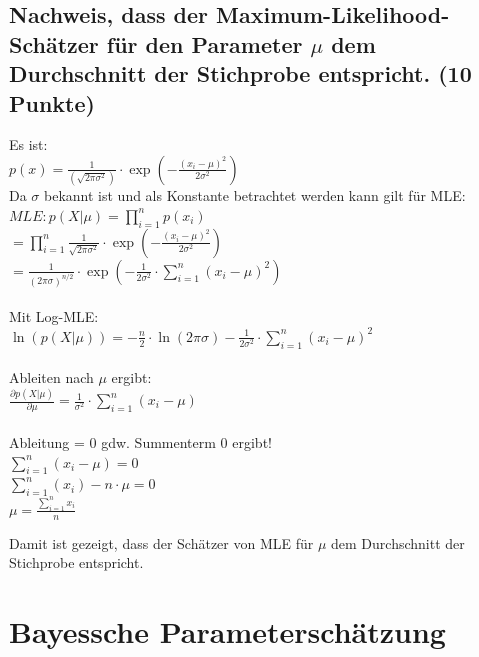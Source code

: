 \documentclass{scrartcl}
\begin{document}
\subsection*{Nachweis, dass der Maximum-Likelihood-Schätzer für den Parameter $\mu$ dem Durchschnitt der Stichprobe entspricht. (10 Punkte)}
Es ist:\\
$p(x)=\frac{1}{(\sqrt{2\pi \sigma^2})} \cdot \exp(-\frac{(x_i-\mu)^2}{2\sigma^2})$\\
Da $\sigma$ bekannt ist und als Konstante betrachtet werden kann gilt für MLE:\\
$MLE: p(X|\mu)=\prod_{i=1}^{n}p(x_i) $\\
$=\prod_{i=1}^{n}\frac{1}{\sqrt{2\pi \sigma^2}} \cdot \exp(-\frac{(x_i-\mu)^2}{2\sigma^2}) $\\
$= \frac{1}{(2\pi \sigma)^{n/2}} \cdot \exp(-\frac{1}{2\sigma^2} \cdot \sum_{i=1}^{n}(x_i-\mu)^2)$\\\\
Mit Log-MLE:\\
$\ln(p(X|\mu))= -\frac{n}{2} \cdot \ln(2\pi \sigma) - \frac{1}{2\sigma^2} \cdot \sum_{i=1}^{n}(x_i-\mu)^2$\\\\
Ableiten nach $\mu$ ergibt:\\
$\frac{\partial p(X|\mu)}{\partial \mu} = \frac{1}{\sigma^2} \cdot \sum_{i=1}^{n}(x_i-\mu)$\\\\
Ableitung = 0 gdw. Summenterm 0 ergibt!\\
$\sum_{i=1}^{n}(x_i-\mu) = 0$\\
$\sum_{i=1}^{n}(x_i)-n \cdot \mu = 0$\\
$\mu = \frac{\sum_{i=1}^{n}x_i}{n}$

Damit ist gezeigt, dass der Schätzer von MLE für $\mu$ dem Durchschnitt der Stichprobe entspricht.
 

\section{Bayessche Parameterschätzung}
\end{document}
